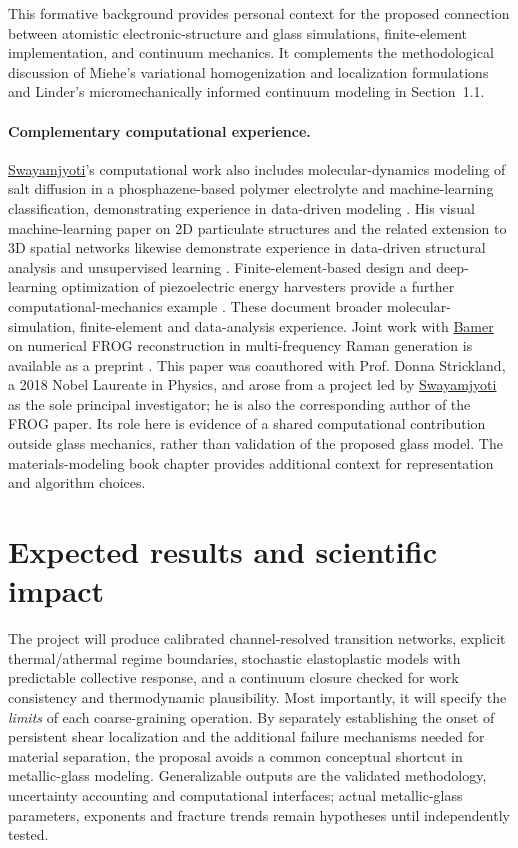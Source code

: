 \documentclass[11pt,a4paper]{article}
\begin{document}
This formative background provides personal context for the proposed connection between atomistic electronic-structure and glass simulations, finite-element implementation, and continuum mechanics. It complements the methodological discussion of Miehe's variational homogenization and localization formulations and Linder's micromechanically informed continuum modeling in Section~1.1.

\paragraph{Complementary computational experience.}
\underline{Swayamjyoti}'s computational work also includes molecular-dynamics modeling of salt diffusion in a phosphazene-based polymer electrolyte \cite{swaypolymer2024} and machine-learning classification, demonstrating experience in data-driven modeling \cite{swayclassify2020}. His visual machine-learning paper on 2D particulate structures and the related extension to 3D spatial networks likewise demonstrate experience in data-driven structural analysis and unsupervised learning \cite{swayvisual2022,swaymodularity2020}. Finite-element-based design and deep-learning optimization of piezoelectric energy harvesters provide a further computational-mechanics example \cite{swayharvester2022}. These document broader molecular-simulation, finite-element and data-analysis experience. Joint work with \underline{Bamer} on numerical FROG reconstruction in multi-frequency Raman generation is available as a preprint \cite{bamerswayfrog2026}. This paper was coauthored with Prof. Donna Strickland, a 2018 Nobel Laureate in Physics, and arose from a project led by \underline{Swayamjyoti} as the sole principal investigator; he is also the corresponding author of the FROG paper. Its role here is evidence of a shared computational contribution outside glass mechanics, rather than validation of the proposed glass model. The materials-modeling book chapter \cite{swaychapter2020} provides additional context for representation and algorithm choices.

\section{Expected results and scientific impact}
The project will produce calibrated channel-resolved transition networks, explicit thermal/athermal regime boundaries, stochastic elastoplastic models with predictable collective response, and a continuum closure checked for work consistency and thermodynamic plausibility. Most importantly, it will specify the \emph{limits} of each coarse-graining operation. By separately establishing the onset of persistent shear localization and the additional failure mechanisms needed for material separation, the proposal avoids a common conceptual shortcut in metallic-glass modeling. Generalizable outputs are the validated methodology, uncertainty accounting and computational interfaces; actual metallic-glass parameters, exponents and fracture trends remain hypotheses until independently tested.
\end{document}
